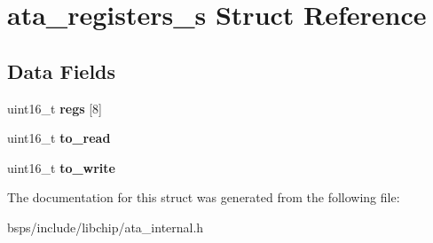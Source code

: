 \hypertarget{structata__registers__s}{}\section{ata\+\_\+registers\+\_\+s Struct Reference}
\label{structata__registers__s}
\subsection*{Data Fields}
\begin{DoxyCompactItemize}
\item 
\mbox{\label{structata__registers__s_a461965f7947334c8174c843e1a230134}} 
uint16\+\_\+t {\bfseries regs} \mbox{[}8\mbox{]}
\item 
\mbox{\label{structata__registers__s_ab4601eec199b99791286cdebb937abb9}} 
uint16\+\_\+t {\bfseries to\+\_\+read}
\item 
\mbox{\label{structata__registers__s_a4a9ff55b722b431876ac9227bb59e045}} 
uint16\+\_\+t {\bfseries to\+\_\+write}
\end{DoxyCompactItemize}


The documentation for this struct was generated from the following file\+:\begin{DoxyCompactItemize}
\item 
bsps/include/libchip/ata\+\_\+internal.\+h\end{DoxyCompactItemize}
